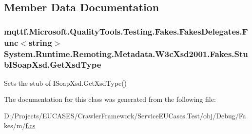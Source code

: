 \subsection{Member Data Documentation}
\hypertarget{class_system_1_1_runtime_1_1_remoting_1_1_metadata_1_1_w3c_xsd2001_1_1_fakes_1_1_stub_i_soap_xsd_aaec2711aff6c42681d88e29ff8d67261}{
\subsubsection[{Get\-Xsd\-Type}]{\setlength{\rightskip}{0pt plus 5cm}mqttf.\-Microsoft.\-Quality\-Tools.\-Testing.\-Fakes.\-Fakes\-Delegates.\-Func$<$string$>$ System.\-Runtime.\-Remoting.\-Metadata.\-W3c\-Xsd2001.\-Fakes.\-Stub\-I\-Soap\-Xsd.\-Get\-Xsd\-Type}}\label{class_system_1_1_runtime_1_1_remoting_1_1_metadata_1_1_w3c_xsd2001_1_1_fakes_1_1_stub_i_soap_xsd_aaec2711aff6c42681d88e29ff8d67261}


Sets the stub of I\-Soap\-Xsd.\-Get\-Xsd\-Type()



The documentation for this class was generated from the following file\-:\begin{DoxyCompactItemize}
\item 
D\-:/\-Projects/\-E\-U\-C\-A\-S\-E\-S/\-Crawler\-Framework/\-Service\-E\-U\-Cases.\-Test/obj/\-Debug/\-Fakes/m/\hyperlink{m_2f_8cs}{f.\-cs}\end{DoxyCompactItemize}

